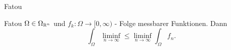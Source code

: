 \documentclass[class=article, crop=false]{standalone}
\begin{document}
\begin{zettel}{Fatou}
\begin{flashcard}[6fu9ltsq]{Fatou}
	$\Omega \in \Omega_{\mathbb{R}^n}$ und $f_k : \Omega \to  [0, \infty)$ - Folge messbarer Funktionen. Dann
	\[
		\int_{\Omega} \liminf_{n \to \infty} \leq \liminf_{n \to  \infty} \int_{\Omega} f_n
	.\]
\end{flashcard}
\end{zettel}
\end{document}
